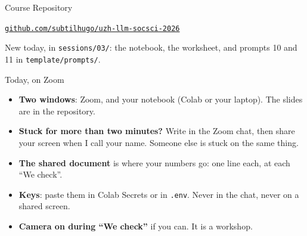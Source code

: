 
\begin{frame}{Course Repository}

\centering
\vspace{0.2cm}

\vspace{0.5cm}
{\large \href{https://github.com/subtilhugo/uzh-llm-socsci-2026}{\texttt{github.com/subtilhugo/uzh-llm-socsci-2026}}}

\vspace{0.4cm}
{\small New today, in \texttt{sessions/03/}: the notebook, the worksheet, and prompts 10 and 11 in \texttt{template/prompts/}.}

\end{frame}

\begin{frame}{Today, on Zoom}

\begin{itemize}
    \setlength{\itemsep}{8pt}
    \item \textbf{Two windows}: Zoom, and your notebook (Colab or your laptop). The slides are in the repository.
    \item \textbf{Stuck for more than two minutes?} Write in the Zoom chat, then share your screen when I call your name. Someone else is stuck on the same thing.
    \item \textbf{The shared document} is where your numbers go: one line each, at each ``We check''.
    \item \textbf{Keys}: paste them in Colab Secrets or in \texttt{.env}. Never in the chat, never on a shared screen.
    \item \textbf{Camera on during ``We check''} if you can. It is a workshop.
\end{itemize}

\end{frame}

